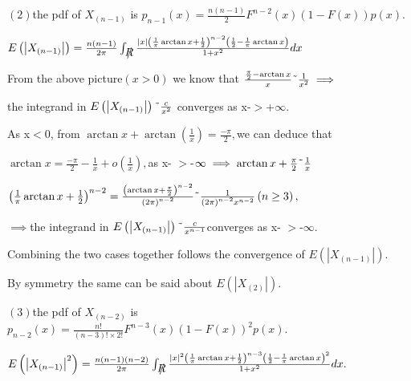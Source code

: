 \documentclass{article}
\def\TEXTsymbol#1{\mbox{$#1$}}%
\def\NEG#1{\leavevmode\hbox{\rlap{\thinspace/}{$#1$}}}%
\begin{document}
$\left( 2\right) $the pdf of $X_{\left( n-1\right) }$ is $p_{n-1}\left(
x\right) =\frac{n\left( n-1\right) }{2}F^{n-2}\left( x\right) \left(
1-F\left( x\right) \right) p\left( x\right) .$

$E\left( \left\vert X_{\left( n-1\right) }\right\vert \right) =\frac{n\left(
n-1\right) }{2\pi }\int_{\NEG{R}}\frac{\left\vert x\right\vert \left( \frac{1%
}{\pi }\arctan x+\frac{1}{2}\right) ^{n-2}\left( \frac{1}{2}-\frac{1}{\pi }%
\arctan x\right) }{1+x^{2}}dx$



From the above picture$\left( x>0\right) $ we know that $\frac{\frac{\pi }{2}%
-\arctan x}{x}\symbol{126}\frac{1}{x^{2}}\implies $

the integrand in $E\left( \left\vert X_{\left( n-1\right) }\right\vert
\right) \symbol{126}\frac{c}{x^{2}}$ converges as x-\TEXTsymbol{>}+$\infty .$

As x\TEXTsymbol{<}0, from $\arctan x+\arctan \left( \frac{1}{x}\right) =%
\frac{-\pi }{2},$we can deduce that 

$\arctan x=\frac{-\pi }{2}-\frac{1}{x}+o\left( \frac{1}{x}\right) ,$as x-%
\TEXTsymbol{>}-$\infty \implies \arctan x+\frac{\pi }{2}\symbol{126}\frac{1}{%
x}$

$\left( \frac{1}{\pi }\arctan x+\frac{1}{2}\right) ^{n-2}=\frac{\left(
\arctan x+\frac{\pi }{2}\right) ^{n-2}}{\left( 2\pi \right) ^{n-2}}\symbol{%
126}\frac{1}{\left( 2\pi \right) ^{n-2}x^{n-2}}\left( n\geq 3\right) ,$

$\implies $the integrand in $E\left( \left\vert X_{\left( n-1\right)
}\right\vert \right) \symbol{126}\frac{c}{x^{n-1}}$converges as x-%
\TEXTsymbol{>}-$\infty .$

Combining the two cases together follows the convergence of $E\left(
\left\vert X_{\left( n-1\right) }\right\vert \right) .$

By symmetry the same can be said about $E\left( \left\vert X_{\left(
2\right) }\right\vert \right) .$

$\left( 3\right) $the pdf of $X_{\left( n-2\right) }$ is $p_{n-2}\left(
x\right) =\frac{n!}{\left( n-3\right) !\times 2!}F^{n-3}\left( x\right)
\left( 1-F\left( x\right) \right) ^{2}p\left( x\right) .$

$E\left( \left\vert X_{\left( n-1\right) }\right\vert ^{2}\right) =\frac{%
n\left( n-1\right) \left( n-2\right) }{2\pi }\int_{\NEG{R}}\frac{\left\vert
x\right\vert ^{2}\left( \frac{1}{\pi }\arctan x+\frac{1}{2}\right)
^{n-3}\left( \frac{1}{2}-\frac{1}{\pi }\arctan x\right) ^{2}}{1+x^{2}}dx.$
\end{document}

